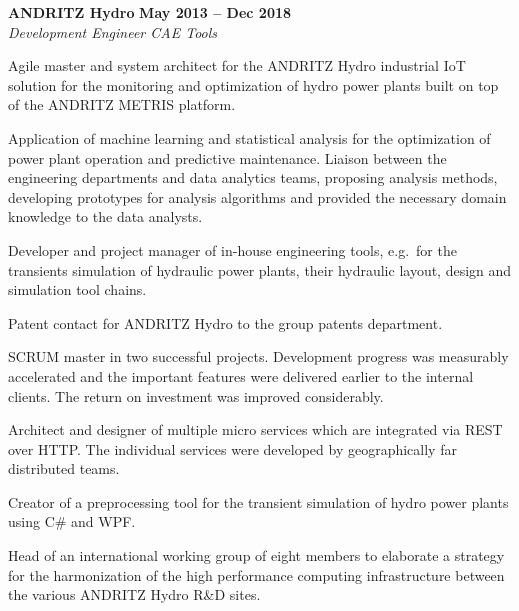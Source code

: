\documentclass[line,11pt,a4paper]{../resume}
\begin{document}
\begin{resume}
\textbf{ANDRITZ Hydro} \hfill \textbf{May 2013 -- Dec 2018}
\vspace{2mm}\\\vspace{1mm}%
\textsl{Development Engineer CAE Tools}\\
\begin{list2}
  \item Agile master and system architect for the ANDRITZ Hydro industrial IoT
    solution for the monitoring and optimization of hydro power plants built on
    top of the ANDRITZ METRIS platform.

  \item Application of machine learning and statistical analysis for the
    optimization of power plant operation and predictive maintenance.
    Liaison between the engineering departments and data analytics teams,
    proposing analysis methods, developing prototypes for analysis algorithms
    and provided the necessary domain knowledge to the data analysts.

  \item Developer and project manager of in-house engineering tools, e.g.\ for
    the transients simulation of hydraulic power plants, their hydraulic
    layout, design and simulation tool chains.

  \item Patent contact for ANDRITZ Hydro to the group patents department.

  \item SCRUM master in two successful projects. Development progress was
    measurably accelerated and the important features were delivered earlier to
    the internal clients. The return on investment was improved considerably.

  \item Architect and designer of multiple micro services which are integrated
    via REST over HTTP. The individual services were developed by
    geographically far distributed teams.

  \item Creator of a preprocessing tool for the transient simulation of hydro
    power plants using C\# and WPF.

  \item Head of an international working group of eight members to elaborate a
    strategy for the harmonization of the high performance computing
    infrastructure between the various ANDRITZ Hydro R\&D sites.
\end{list2}


\end{resume}
\end{document}
